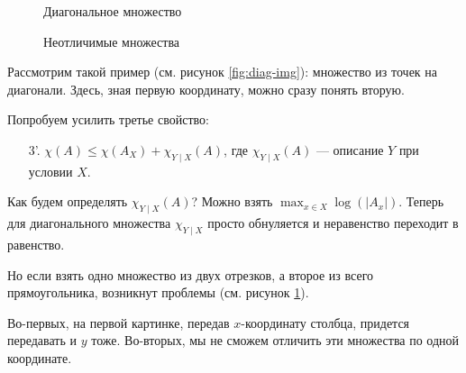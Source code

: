 \begin{figure}[h]
\begin{minipage}{0.5\textwidth}
    \centering
	\caption{Диагональное множество}
    \label{fig:diag-img}
\end{minipage}
\begin{minipage}{0.5\textwidth}
    \centering
	\caption{Неотличимые множества}
    \label{fig:corner-img}
\end{minipage}
\end{figure}
\begin{ex}
	Рассмотрим такой пример (см. рисунок \ref{fig:diag-img}): множество из точек на диагонали.
Здесь, зная первую координату, можно сразу понять вторую.
\end{ex}
Попробуем усилить третье свойство:
\begin{enumerate}
	\item[3'.] $ \chi(A) \le \chi(A_{X}) + \chi_{Y \mid X} (A)$, где $ \chi _{Y \mid X}(A)$ --- описание $ Y$ при условии $ X$.
\end{enumerate} 
Как будем определять $ \chi_{Y \mid X} (A)$?
Можно взять $ \max_{x \in X} \log(\lvert A_x \rvert)$.
Теперь для диагонального множества $ \chi_{Y \mid X}$ просто обнуляется и неравенство переходит в равенство.

\begin{ex}
	Но если взять одно множество из двух отрезков, а второе из всего прямоугольника, возникнут проблемы (см. рисунок \ref{fig:corner-img}). 

Во-первых, на первой картинке, передав $ x$-координату столбца, придется передавать  и $ y$ тоже. Во-вторых, мы не сможем отличить эти множества по одной координате.
\end{ex}

